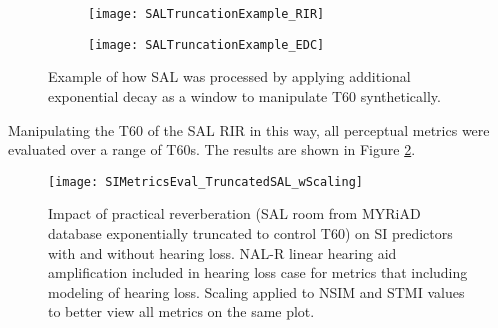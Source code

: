 


\begin{figure}[H]
	\centering
	\begin{subfigure}[b]{0.49\textwidth}
		\centering
		\texttt{[image: SALTruncationExample\_RIR]}
	\end{subfigure}
	\hfill
	\begin{subfigure}[b]{0.49\textwidth}
		\centering
		\texttt{[image: SALTruncationExample\_EDC]}
	\end{subfigure}
	\hfill
	\caption[Example of exponential windowing of RIRs to reduce T60]{Example of how SAL was processed by applying additional exponential decay as a window to manipulate T60 synthetically.}
	\label{fig:SALTruncationExample}
\end{figure}

Manipulating the T60 of the SAL RIR in this way, all perceptual metrics were evaluated over a range of T60s. The results are shown in Figure \ref{fig:SIMetricsEval_TruncatedSAL_wScaling}.

\begin{figure}[H]
	\texttt{[image: SIMetricsEval\_TruncatedSAL\_wScaling]}
	\centering
	\caption[Impact of exponentially windowed real RIRs on proposed SI predictors (after scaling)]{Impact of practical reverberation (SAL room from MYRiAD database exponentially truncated to control T60) on SI predictors with and without hearing loss. NAL-R linear hearing aid amplification included in hearing loss case for metrics that including modeling of hearing loss.  Scaling applied to NSIM and STMI values to better view all metrics on the same plot.}
	\label{fig:SIMetricsEval_TruncatedSAL_wScaling}
\end{figure}

